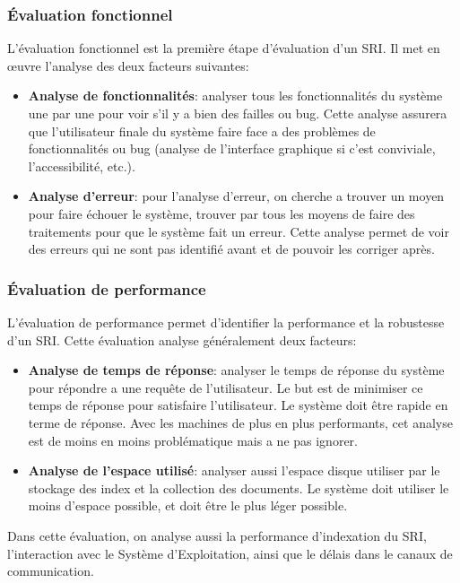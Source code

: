 \subsubsection{Évaluation fonctionnel}
L'évaluation fonctionnel est la première étape d'évaluation d'un SRI. Il met en œuvre l'analyse des deux facteurs suivantes:
\begin{itemize}
	\item \textbf{Analyse de fonctionnalités}: analyser tous les fonctionnalités du système une par une pour voir s'il y a bien des failles ou bug. Cette analyse assurera que l'utilisateur finale du système faire face a des problèmes de fonctionnalités ou bug (analyse de l'interface graphique si c'est conviviale, l'accessibilité, etc.).
	\item \textbf{Analyse d’erreur}: pour l'analyse d'erreur, on cherche a trouver un moyen pour faire échouer le système, trouver par tous les moyens de faire des traitements pour que le système fait un erreur. Cette analyse permet de voir des erreurs qui ne sont pas identifié avant et de pouvoir les corriger après.
\end{itemize}

\subsubsection{Évaluation de performance}
L'évaluation de performance permet d'identifier la performance et la robustesse d'un SRI. Cette évaluation analyse généralement deux facteurs:
\begin{itemize}
	\item \textbf{Analyse de temps de réponse}: analyser le temps de réponse du système pour répondre a une requête de l'utilisateur. Le but est de minimiser ce temps de réponse pour satisfaire l'utilisateur. Le système doit être rapide en terme de réponse. Avec les machines de plus en plus performants, cet analyse est de moins en moins problématique mais a ne pas ignorer.
	\item \textbf{Analyse de l’espace utilisé}: analyser aussi l'espace disque utiliser par le stockage des index et la collection des documents. Le système doit utiliser le moins d’espace possible, et doit être le plus léger possible.
\end{itemize}

Dans cette évaluation, on analyse aussi la performance d'indexation du SRI, l’interaction avec le Système d'Exploitation, ainsi que le délais dans le canaux de communication.

